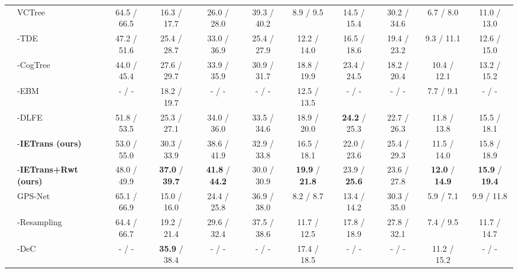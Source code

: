 \documentclass[runningheads]{llncs}
\begin{document}
\begin{table*}[t]
\begin{center}
{\begin{tabular}{ll ccc ccc ccc}
 \cmidrule{2-11}
&  VCTree~\cite{tang2019learning} & 64.5 / 66.5 & 16.3 / 17.7 & 26.0 / 28.0 & 39.3 / 40.2 & 8.9 / 9.5  & 14.5 / 15.4 & 30.2 / 34.6 &  6.7 / 8.0 & 11.0 / 13.0   \\ &  \quad -TDE~\cite{tang2020unbiased} & 47.2 / 51.6 & 25.4 / 28.7 & 33.0 / 36.9 & 25.4 / 27.9 & 12.2 / 14.0 & 16.5 / 18.6 & 19.4 / 23.2 & 9.3 / 11.1 & 12.6 / 15.0   \\
 &  \quad -CogTree~\cite{yu2020cogtree} & 44.0 / 45.4  & 27.6 / 29.7 & 33.9 / 35.9 & 30.9 / 31.7 & 18.8 / 19.9 & 23.4 / 24.5 & 18.2 / 20.4 & 10.4 / 12.1 & 13.2 / 15.2  \\
  &  \quad -EBM~\cite{ebm2021energy} & - / - & 18.2 / 19.7 & - / - & - / - & 12.5 / 13.5 & - / - & - / - & 7.7 / 9.1 & - / -  \\
 &  \quad -DLFE~\cite{dlfe2021recovering} & 51.8 / 53.5 & 25.3 / 27.1 & 34.0 / 36.0 & 33.5 / 34.6 & 18.9  / 20.0 & \textbf{24.2} / 25.3 & 22.7 / 26.3 & 11.8  / 13.8 & 15.5 / 18.1   \\
  &  \quad -\textbf{IETrans (ours)} & 53.0 / 55.0 & 30.3 / 33.9 & 38.6 / 41.9 & 32.9 / 33.8 & 16.5 / 18.1 & 22.0 / 23.6 & 25.4 / 29.3 & 11.5 / 14.0 & 15.8 / 18.9  \\
 & \quad -\textbf{IETrans+Rwt (ours)} & 48.0 / 49.9 & \textbf{37.0} / \textbf{39.7} & \textbf{41.8} / \textbf{44.2} & 30.0 / 30.9 & \textbf{19.9} / \textbf{21.8} & 23.9 / \textbf{25.6} & 23.6 / 27.8 & \textbf{12.0} / \textbf{14.9} & \textbf{15.9} / \textbf{19.4}  \\
\cmidrule{2-11}
& GPS-Net~\cite{lin2020gps} & 65.1 / 66.9 & 15.0 / 16.0 & 24.4 / 25.8 & 36.9 / 38.0 & 8.2 / 8.7 & 13.4 / 14.2 &  30.3 / 35.0  & 5.9 / 7.1 & 9.9 / 11.8   \\
  & \quad -Resampling~\cite{li2021bipartite} & 64.4 / 66.7 & 19.2 / 21.4 & 29.6 / 32.4 & 37.5 / 38.6 & 11.7 / 12.5 & 17.8 / 18.9 & 27.8 / 32.1 & 7.4 / 9.5 & 11.7 / 14.7   \\
& \quad -DeC~\cite{dec2021semantic} & - / - & \textbf{35.9} / 38.4 & - / - & - / - & 17.4 / 18.5 & - / - & - / - & 11.2 / 15.2 & - / -  \\


\end{tabular}}
\end{center}
\end{table*}
\end{document}
